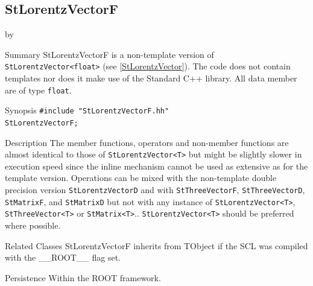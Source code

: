\documentclass[twoside]{article}
\newcommand{\name}[1]{\textsf{#1}}%
\newcommand{\entrylabel}[1]{\mbox{\textbf{{#1}}}\hfil}%
\newenvironment{entry}
{\begin{list}{}%
    {\renewcommand{\makelabel}{\entrylabel}%
     \setlength{\labelwidth}{90pt}%
     \setlength{\leftmargin}{\labelwidth}
     \advance\leftmargin by \labelsep%
      }%
    }%
  {\end{list}}
\newcommand{\Entrylabel}[1]%
{\raisebox{0pt}[1ex][0pt]{\makebox[\labelwidth][l]%
    {\parbox[t]{\labelwidth}{\hspace{0pt}\textbf{{#1}}}}}}
\newenvironment{Entry}%
{\renewcommand{\entrylabel}{\Entrylabel}\begin{entry}}%
  {\end{entry}}
\begin{document}
\subsection{StLorentzVectorF } \label{StLorentzVectorF}
\begin{Entry}
\item[Summary]
    StLorentzVectorF is a non-template version of \verb+StLorentzVector<float>+
    (see \ref{StLorentzVector}). The code does not contain templates nor
    does it make use of the Standard C++ library. All data member are of
    type \texttt{float}.
    
\item[Synopsis]
    \verb+#include "StLorentzVectorF.hh"+ \\
    \verb+StLorentzVectorF;+
    
    
\item[Description]       
    The member functions, operators and non-member functions are almost identical
    to those of \verb+StLorentzVector<T>+ but might be slightly slower in execution speed
    since the inline mechanism cannot be used as extensive as for the template
    version. Operations can be mixed with the non-template double precision version
    \texttt{StLorentzVectorD} and with \texttt{StThreeVectorF}, \texttt{StThreeVectorD},
    \texttt{StMatrixF}, and \texttt{StMatrixD}
    but not with any instance of \verb+StLorentzVector<T>+, \verb+StThreeVector<T>+ or
    \verb+StMatrix<T>+..
    \verb+StLorentzVector<T>+ should be preferred where possible.

\item[Related Classes]
    StLorentzVectorF inherits from TObject 
    if the SCL was compiled with the \name{\_\_ROOT\_\_} flag set.
    
\item[Persistence]
    Within the ROOT framework.

\end{Entry}

\clearpage

%
%
\end{document}
